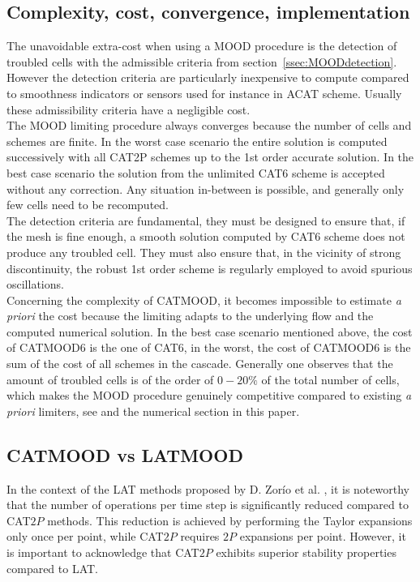 \subsection{Complexity, cost, convergence, implementation}
The unavoidable extra-cost when using a MOOD procedure is the detection of troubled cells with the admissible criteria from section~\ref{ssec:MOODdetection}.
However the detection criteria are particularly inexpensive to compute compared to smoothness indicators or sensors used for instance in ACAT scheme. Usually these admissibility criteria have a negligible cost. \\
The MOOD limiting procedure always converges because the number of cells and schemes are finite. In the worst case scenario the entire solution is computed successively with all CAT2P schemes up to the 1st order accurate solution.
In the best case scenario the solution from the unlimited CAT6 scheme is accepted without any correction.
Any situation in-between is possible, and generally only few cells need to be recomputed. \\
The detection criteria are fundamental, they must be designed to ensure that, if the mesh is fine enough, a smooth solution computed by CAT6 scheme does not produce any troubled cell. 
They must also ensure that, in the vicinity of strong discontinuity, the robust 1st order scheme is regularly employed to avoid spurious oscillations. \\
Concerning the complexity of CATMOOD, it becomes impossible to estimate \textit{a priori} the cost because the limiting adapts to the underlying flow and the computed numerical solution. In the best case scenario mentioned above, the cost of CATMOOD6 is the one of CAT6, in the worst, the cost of CATMOOD6 is the sum of the cost of all schemes in the cascade.
Generally one observes that the amount of troubled cells is of the order of $0-20\%$ of the total number of cells, which makes the MOOD procedure genuinely competitive compared to existing \textit{a priori} limiters, see \cite{CDL2,ADER_MOOD_14} and the numerical section in this paper. 

\subsection{CATMOOD vs LATMOOD}
In the context of the LAT methods proposed by D. Zorío et al. \cite{ZBM2017}, it is noteworthy that the number of operations per time step is significantly reduced compared to CAT$2P$ methods. This reduction is achieved by performing the Taylor expansions only once per point, while CAT$2P$ requires $2P$ expansions per point. However, it is important to acknowledge that CAT$2P$ exhibits superior stability properties compared to LAT.


